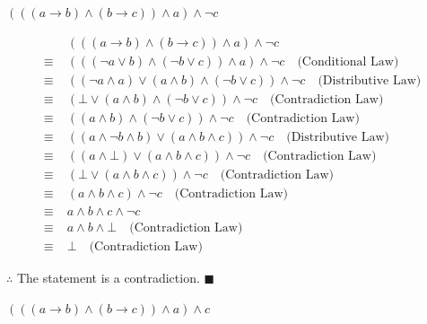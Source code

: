\documentclass[]{article}
\begin{document}
\begin{question}
    $(((a \rightarrow b) \land (b \rightarrow c)) \land a) \land \neg c$
\end{question}
\begin{align*}
    & (((a \rightarrow b) \land (b \rightarrow c)) \land a) \land \neg c \\
    \equiv\; & (((\neg a \lor b) \land (\neg b \lor c)) \land a) \land \neg c \quad \text{(Conditional Law)} \\
    \equiv\; & ((\neg a \land a) \lor (a\land b) \land (\neg b \lor c)) \land \neg c \quad \text{(Distributive Law)} \\
    \equiv\; & (\bot \lor (a\land b) \land (\neg b \lor c)) \land \neg c \quad \text{(Contradiction Law)} \\
    \equiv\; & ((a\land b) \land (\neg b \lor c)) \land \neg c \quad \text{(Contradiction Law)} \\
    \equiv\; & ((a \land \neg b \land b) \lor (a \land b \land c)) \land \neg c \quad \text{(Distributive Law)} \\
    \equiv\; & ((a \land \bot) \lor (a\land b\land c)) \land \neg c \quad \text{(Contradiction Law)} \\
    \equiv\; & (\bot \lor (a\land b\land c)) \land \neg c \quad \text{(Contradiction Law)} \\
    \equiv\; & (a\land b\land c) \land \neg c \quad \text{(Contradiction Law)} \\
    \equiv & a \land b \land c \land \neg c \quad \\
    \equiv\; & a \land b \land \bot \quad \text{(Contradiction Law)} \\
    \equiv\; & \bot \quad \text{(Contradiction Law)}
\end{align*}
\begin{center}
    $\therefore$ The statement is a contradiction. $\blacksquare$
\end{center}
\vspace{1.7in}
\begin{question}
    $(((a \rightarrow b) \land (b \rightarrow c)) \land a) \land  c$
\end{question}
\end{document}
